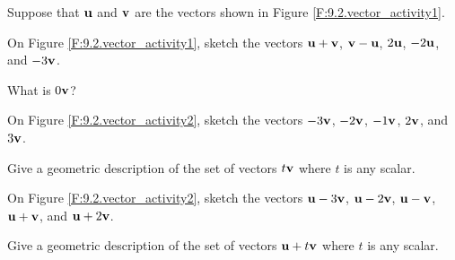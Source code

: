 \begin{activity}
Suppose that $\mathbf{u}$ and $\mathbf{v}$ are the vectors shown in Figure
\ref{F:9.2.vector_activity1}.   
	\ba
	\item On Figure \ref{F:9.2.vector_activity1}, sketch the
          vectors $\mathbf{u} + \mathbf{v}$, $\mathbf{v} - \mathbf{u}$, $2\mathbf{u}$, $-2\mathbf{u}$, and $-3\mathbf{v}$. 
        \item What is $0\mathbf{v}$?
        \item On Figure \ref{F:9.2.vector_activity2}, sketch the
          vectors $-3\mathbf{v}$, $-2\mathbf{v}$, $-1\mathbf{v}$, $2\mathbf{v}$, and $3\mathbf{v}$.
        \item Give a geometric description of the set of vectors
          $t\mathbf{v}$ where $t$ is any scalar.
        \item On Figure \ref{F:9.2.vector_activity2}, sketch the
          vectors $\mathbf{u}-3\mathbf{v}$, $\mathbf{u}-2\mathbf{v}$, $\mathbf{u}-\mathbf{v}$, $\mathbf{u} + \mathbf{v}$, and
          $\mathbf{u} + 2\mathbf{v}$.  
        \item Give a geometric description of the set of vectors
          $\mathbf{u} + t\mathbf{v}$ where $t$ is any scalar.

	\ea


\end{activity}
\begin{smallhint}

\end{smallhint}
\begin{bighint}

\end{bighint}
